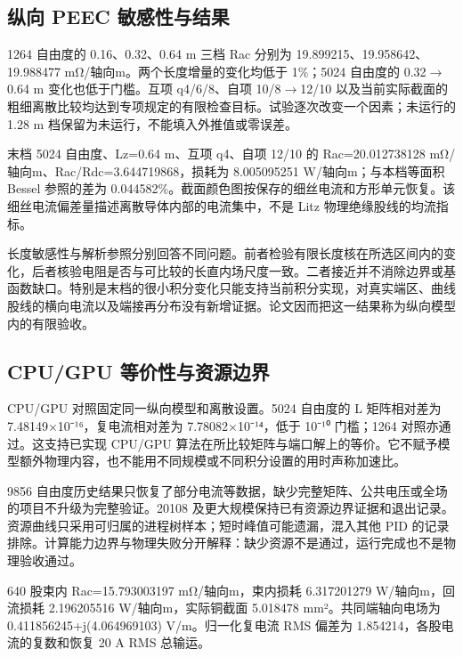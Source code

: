 \documentclass[11pt]{article}
\begin{document}
\subsection*{纵向 PEEC 敏感性与结果}
\hypertarget{03.peec_results.heading}{}
1264 自由度的 0.16、0.32、0.64 m 三档 Rac 分别为 19.899215、19.958642、19.988477 mΩ/轴向m。两个长度增量的变化均低于 1\%；5024 自由度的 0.32\(\to\)0.64 m 变化也低于门槛。互项 q4/6/8、自项 10/8\(\to\)12/10 以及当前实际截面的粗细离散比较均达到专项规定的有限检查目标。试验逐次改变一个因素；未运行的 1.28 m 档保留为未运行，不能填入外推值或零误差。


末档 5024 自由度、Lz=0.64 m、互项 q4、自项 12/10 的 Rac=20.012738128 mΩ/轴向m、Rac/Rdc=3.644719868，损耗为 8.005095251 W/轴向m；与本档等面积 Bessel 参照的差为 0.044582\%。截面颜色图按保存的细丝电流和方形单元恢复。该细丝电流偏差量描述离散导体内部的电流集中，不是 Litz 物理绝缘股线的均流指标。


长度敏感性与解析参照分别回答不同问题。前者检验有限长度核在所选区间内的变化，后者核验电阻是否与可比较的长直内场尺度一致。二者接近并不消除边界或基函数缺口。特别是末档的很小积分变化只能支持当前积分实现，对真实端区、曲线股线的横向电流以及端接再分布没有新增证据。论文因而把这一结果称为纵向模型内的有限验收。


\subsection*{CPU/GPU 等价性与资源边界}
\hypertarget{03.compute.heading}{}
CPU/GPU 对照固定同一纵向模型和离散设置。5024 自由度的 L 矩阵相对差为 7.48149×10⁻¹⁶，复电流相对差为 7.78082×10⁻¹⁴，低于 10⁻¹⁰ 门槛；1264 对照亦通过。这支持已实现 CPU/GPU 算法在所比较矩阵与端口解上的等价。它不赋予模型额外物理内容，也不能用不同规模或不同积分设置的用时声称加速比。


9856 自由度历史结果只恢复了部分电流等数据，缺少完整矩阵、公共电压或全场的项目不升级为完整验证。20108 及更大规模保持已有资源边界证据和退出记录。资源曲线只采用可归属的进程树样本；短时峰值可能遗漏，混入其他 PID 的记录排除。计算能力边界与物理失败分开解释：缺少资源不是通过，运行完成也不是物理验收通过。


640 股束内 Rac=15.793003197 mΩ/轴向m，束内损耗 6.317201279 W/轴向m，回流损耗 2.196205516 W/轴向m，实际铜截面 5.018478 mm²。共同端轴向电场为 0.411856245+j(4.064969103) V/m。归一化复电流 RMS 偏差为 1.854214，各股电流的复数和恢复 20 A RMS 总输运。
\end{document}
